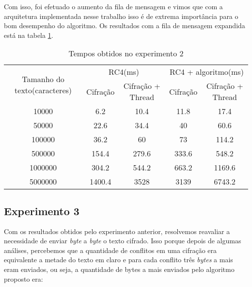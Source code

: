 Com isso, foi efetuado o aumento da fila de mensagem e vimos que com a arquitetura implementada nesse trabalho isso é de extrema importância para o bom desempenho do algoritmo. Os resultados com a fila de mensagem expandida está na tabela \ref{results-experiment-2}.

\begin{table}[h]
\begin{tabular}{|c|c|c|c|c|}
\hline
\multirow{2}{3cm}{Tamanho do texto(caracteres)} & \multicolumn{2}{c|}{RC4(ms)}     & \multicolumn{2}{c|}{RC4 + algoritmo(ms)} \\ \cline{2-5} 
                                     & Cifração & Cifração + Thread & Cifração     & Cifração + Thread     \\ \hline
10000                                & 6.2      & 10.4              & 11.8         & 17.4                  \\ \hline
50000                                & 22.6     & 34.4              & 40           & 60.6                  \\ \hline
100000                               & 36.2     & 60                & 73           & 114.2                 \\ \hline
500000                               & 154.4    & 279.6             & 333.6        & 548.2                 \\ \hline
1000000                              & 304.2    & 544.2             & 663.2        & 1169.6                \\ \hline
5000000                              & 1400.4   & 3528              & 3139         & 6743.2      \\ \hline
\end{tabular}
\caption{Tempos obtidos no experimento 2}
\label{results-experiment-2}
\end{table}

\subsection{Experimento 3}

Com os resultados obtidos pelo experimento anterior, resolvemos reavaliar a necessidade de enviar \textit{byte} a \textit{byte} o texto cifrado. Isso porque depois de algumas análises, percebemos que a quantidade de conflitos em uma cifração era equivalente a metade do texto em claro e para cada conflito três \textit{bytes} a mais eram enviados, ou seja, a quantidade de bytes a mais enviados pelo algoritmo proposto era:

